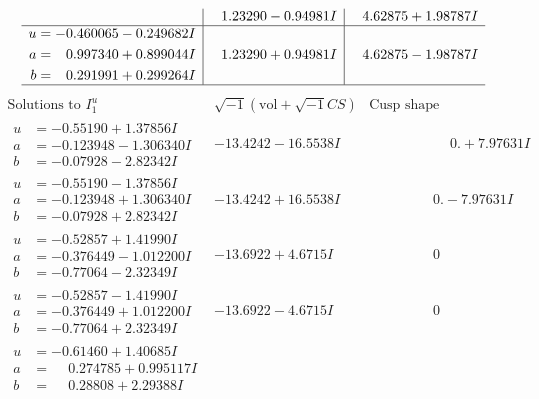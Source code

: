 \documentclass[1p]{elsarticle_modified}
\theoremstyle{definition}
\newcommand{\I}{\sqrt{-1}}
\begin{document}
$$\begin{array}{c|c|c}
 & \phantom{-}1.23290 - 0.94981 I & \phantom{-}4.62875 + 1.98787 I \\ \hline\begin{aligned}
u &= -0.460065 - 0.249682 I \\
a &= \phantom{-}0.997340 + 0.899044 I \\
b &= \phantom{-}0.291991 + 0.299264 I\end{aligned}
 & \phantom{-}1.23290 + 0.94981 I & \phantom{-}4.62875 - 1.98787 I\\
 \hline 
 \end{array}$$\newpage$$\begin{array}{c|c|c}  
\text{Solutions to }I^u_{1}& \I (\text{vol} + \sqrt{-1}CS) & \text{Cusp shape}\\
 \hline 
\begin{aligned}
u &= -0.55190 + 1.37856 I \\
a &= -0.123948 - 1.306340 I \\
b &= -0.07928 - 2.82342 I\end{aligned}
 & -13.4242 - 16.5538 I & \phantom{-0.000000 -}0. + 7.97631 I \\ \hline\begin{aligned}
u &= -0.55190 - 1.37856 I \\
a &= -0.123948 + 1.306340 I \\
b &= -0.07928 + 2.82342 I\end{aligned}
 & -13.4242 + 16.5538 I & \phantom{-0.000000 } 0. - 7.97631 I \\ \hline\begin{aligned}
u &= -0.52857 + 1.41990 I \\
a &= -0.376449 - 1.012200 I \\
b &= -0.77064 - 2.32349 I\end{aligned}
 & -13.6922 + 4.6715 I & \phantom{-0.000000 } 0 \\ \hline\begin{aligned}
u &= -0.52857 - 1.41990 I \\
a &= -0.376449 + 1.012200 I \\
b &= -0.77064 + 2.32349 I\end{aligned}
 & -13.6922 - 4.6715 I & \phantom{-0.000000 } 0 \\ \hline\begin{aligned}
u &= -0.61460 + 1.40685 I \\
a &= \phantom{-}0.274785 + 0.995117 I \\
b &= \phantom{-}0.28808 + 2.29388 I\end{aligned}

\end{array}$$
\end{document}
